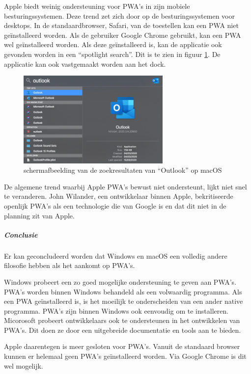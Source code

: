 		
		Apple biedt weinig ondersteuning voor PWA's in zijn mobiele besturingssystemen. Deze trend zet zich door op de besturingssystemen voor desktops. In de standaardbrowser, Safari, van de toestellen kan een PWA niet geïnstalleerd worden. Als de gebruiker Google Chrome gebruikt, kan een PWA wel geïnstalleerd worden. Als deze geïnstalleerd is, kan de applicatie ook gevonden worden in een “spotlight search”. Dit is te zien in figuur \ref{fig:screenSearchmac}. De applicatie kan ook vastgemaakt worden aan het dock.
		
		\begin{figure}[H]
			\centering
			\includegraphics[width=75mm]{./img/Outlook_search_mac.png}
			\caption{schermafbeelding van de zoekresultaten van “Outlook” op macOS}
			\label{fig:screenSearchmac}
		\end{figure}
		
		De algemene trend waarbij Apple PWA's bewust niet ondersteunt, lijkt niet snel te veranderen. John Wilander, een ontwikkelaar binnen Apple, bekritiseerde openlijk PWA's als een technologie die van Google is en dat dit niet in de planning zit van Apple. 
		\autocite{Wilander2019}
		
		
		\subparagraph{Conclusie}
		Er kan geconcludeerd worden dat Windows en macOS een volledig andere filosofie hebben als het aankomt op PWA's. 
		
		Windows probeert een zo goed mogelijke ondersteuning te geven aan PWA's. PWA's worden binnen Windows behandeld als een volwaardig programma. Als een PWA geïnstalleerd is, is het moeilijk te onderscheiden van een ander native programma.
		PWA's zijn binnen Windows ook eenvoudig om te installeren.
		Micorosoft probeert ontwikkelaars ook te ondersteunen in het ontwikkelen van PWA's. Dit doen ze door een uitgebreide documentatie en tools aan te bieden.
		
		Apple daarentegen is meer gesloten voor PWA's. Vanuit de standaard browser kunnen er helemaal geen PWA's geïnstalleerd worden. Via Google Chrome is dit wel mogelijk.
		